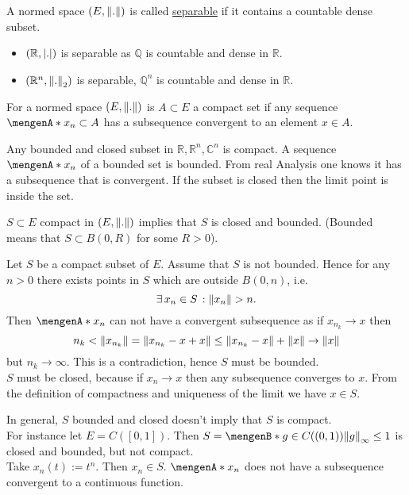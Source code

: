 \begin{definition*}[separable]
	A normed space $(E,\norm{.})$ is called \underline{separable} if it contains a countable dense subset.
\end{definition*}
\begin{beispiele}
	\begin{itemize}
		\item $(\mathbb{R},\lvert.\rvert)$ is separable as $\mathbb{Q}$ is countable and dense in $\mathbb{R}$.
		\item $(\mathbb{R}^n,\norm{.}_2)$ is separable, $\mathbb{Q}^n$ is countable and dense in $\mathbb{R}$.
	\end{itemize}
\end{beispiele}
\begin{definition*}
	For a normed space $(E,\norm{.})$ is $A \subset E$ a compact set if any sequence $\set{x_n} \subset A$ has a subsequence convergent to an element $x \in A$.
\end{definition*}
\begin{beispiel}
	 Any bounded and closed subset in $\mathbb{R}, \mathbb{R}^n, \mathbb{C}^n$ is compact. A sequence $\set{x_n}$ of a bounded set is bounded. From real Analysis one knows it has a subsequence that is convergent. If the subset is closed then the limit point is inside the set. 
\end{beispiel}
\begin{lemma*}
	$S \subset E$ compact in $(E, \norm{.})$ implies that $S$ is closed and bounded. (Bounded means that $S \subset B(0,R)$ for some $R>0$).
\end{lemma*}
\begin{beweis}
	Let $S$ be a compact subset of $E$. Assume that $S$ is not bounded. Hence for any $n >0$ there exists points in $S$ which are outside $B(0,n)$, i.e. 
	\[
		\exists\, x_n \in S \,: \norm{x_n} >n.
	\]
	Then $\set{x_n}$ can not have a convergent subsequence as if $x_{n_k} \to x$ then
	\[
		n_k < \norm{x_{n_k}} = \norm{x_{n_k}-x + x} \leq \norm{x_{n_k}-x} + \norm{x} \to \norm{x}
	\]
	but $n_k \to \infty$. This is a contradiction, hence $S$ must be bounded. \\ $S$ must be closed, because if $x_n \to x$ then any subsequence converges to $x$. From the definition of compactness and uniqueness of the limit we have $x \in S$. \\
\end{beweis}
\begin{bemerkung}
	In general, $S$ bounded and closed doesn't imply that $S$ is compact. \\
For instance let $E= C([0,1])$. Then $S=\set[g \in C((0,1))]{\norm{g}_{\infty}\leq 1}$ is closed and bounded, but not compact. \\
Take $x_n(t):=t^n$. Then $x_n \in S$. $\set{x_n}$ does not have a subsequence convergent to a continuous function.
\end{bemerkung}

